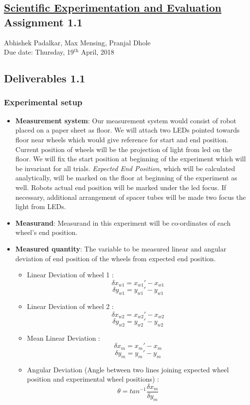\documentclass[11pt,a4paper,openright,twoside]{extreport}
\begin{document}
\begin{center}
\section*{\underline{Scientific Experimentation and Evaluation}\\{Assignment 1.1}}
\large{Abhishek Padalkar, Max Mensing, Pranjal Dhole}\\
\large{Due date: Thursday, 19$^{\text{th}}$ April, 2018}
\end{center}

\subsection*{Deliverables 1.1}
\subsubsection*{Experimental setup}
\begin{itemize}
\item \textbf{Measurement system}: Our measurement system would consist of robot placed on a paper sheet as floor. We will attach two LEDs pointed towards floor near wheels which would give reference for start and end position. Current position of wheels will be the projection of light from led on the floor. We will fix the start position at beginning of the experiment which will be invariant for all trials. \textit{Expected End Position}, which will be calculated analytically, will be marked on the floor at beginning of the experiment as well. Robots actual end position will be marked under the led focus. If necessary, additional arrangement of spacer tubes will be made two focus the light from LEDs. 

\item \textbf{Measurand}: Measurand in this experiment will be co-ordinates of each wheel's end position. 

\item \textbf{Measured quantity}: The variable to be measured linear and angular deviation of end position of the wheels from expected end position. 

\begin{itemize}
	\item Linear Deviation of wheel 1 : 
	$$\delta x_{w1} = x_{w1}' - x_{w1}$$
	$$\delta y_{w1} = y_{w1}' - y_{w1}$$
	\item Linear Deviation of wheel 2 : 
	$$\delta x_{w2} = x_{w2}' - x_{w2}$$
	$$\delta y_{w2} = y_{w2}' - y_{w2}$$
	\item Mean Linear Deviation :  
	$$\delta x_{m} = x_{m}' - x_{m}$$
	$$\delta y_{m} = y_{m}' - y_{m}$$
	\item Angular Deviation (Angle between two lines joining expected wheel position and experimental wheel positions) : 
	$$\theta = tan^{-1}\frac{\delta x_{m}}{\delta y_{m}}$$
	
\end{itemize}





\end{itemize}
\end{document}
